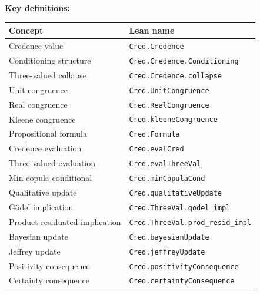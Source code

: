 \documentclass[11pt,a4paper]{article}
\begin{document}
\textbf{Key definitions:}
\begin{center}
\small
\begin{tabular}{ll}
\toprule
\textbf{Concept} & \textbf{Lean name} \\
\midrule
Credence value & \texttt{Cred.Credence} \\
Conditioning structure & \texttt{Cred.Credence.Conditioning} \\
Three-valued collapse & \texttt{Cred.Credence.collapse} \\
Unit congruence & \texttt{Cred.UnitCongruence} \\
Real congruence & \texttt{Cred.RealCongruence} \\
Kleene congruence & \texttt{Cred.kleeneCongruence} \\
Propositional formula & \texttt{Cred.Formula} \\
Credence evaluation & \texttt{Cred.evalCred} \\
Three-valued evaluation & \texttt{Cred.evalThreeVal} \\
Min-copula conditional & \texttt{Cred.minCopulaCond} \\
Qualitative update & \texttt{Cred.qualitativeUpdate} \\
G\"odel implication & \texttt{Cred.ThreeVal.godel\_impl} \\
Product-residuated implication & \texttt{Cred.ThreeVal.prod\_resid\_impl} \\
Bayesian update & \texttt{Cred.bayesianUpdate} \\
Jeffrey update & \texttt{Cred.jeffreyUpdate} \\
Positivity consequence & \texttt{Cred.positivityConsequence} \\
Certainty consequence & \texttt{Cred.certaintyConsequence} \\
\bottomrule
\end{tabular}
\normalsize
\end{center}
\end{document}
